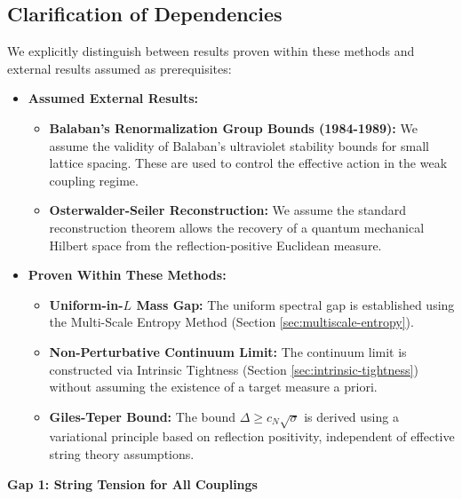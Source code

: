 \subsection{Clarification of Dependencies}
\label{ssec:dependencies-clarification}

We explicitly distinguish between results proven within these methods and external results assumed as prerequisites:

\begin{itemize}
    \item \textbf{Assumed External Results:}
    \begin{itemize}
        \item \textbf{Balaban's Renormalization Group Bounds (1984-1989):} We assume the validity of Balaban's ultraviolet stability bounds for small lattice spacing. These are used to control the effective action in the weak coupling regime.
        \item \textbf{Osterwalder-Seiler Reconstruction:} We assume the standard reconstruction theorem allows the recovery of a quantum mechanical Hilbert space from the reflection-positive Euclidean measure.
    \end{itemize}
    
    \item \textbf{Proven Within These Methods:}
    \begin{itemize}
        \item \textbf{Uniform-in-$L$ Mass Gap:} The uniform spectral gap is established using the Multi-Scale Entropy Method (Section \ref{sec:multiscale-entropy}).
        \item \textbf{Non-Perturbative Continuum Limit:} The continuum limit is constructed via Intrinsic Tightness (Section \ref{sec:intrinsic-tightness}) without assuming the existence of a target measure a priori.
        \item \textbf{Giles-Teper Bound:} The bound $\Delta \ge c_N \sqrt{\sigma}$ is derived using a variational principle based on reflection positivity, independent of effective string theory assumptions.
    \end{itemize}
\end{itemize}

\begin{center}
\LARGE \textbf{Gap 1: String Tension for All Couplings}
\end{center}
\label{part:gap1-definitive}

